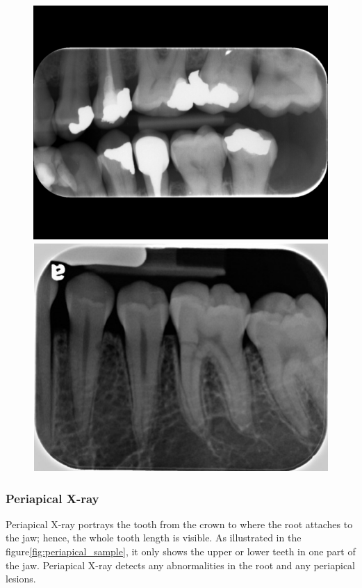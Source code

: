 \begin{figure}
    \begin{floatrow}[2]
        {\includegraphics[width=\linewidth]{images/bitewing_xray.png}}\;
        {\includegraphics[width=\linewidth]{images/periapical_xray.png}}
    \end{floatrow}
\end{figure}

\subsubsection{Periapical X-ray}
Periapical X-ray portrays the tooth from the crown to where the root attaches to the jaw; hence, the whole tooth length is visible. As illustrated in the figure\ref{fig:periapical_sample}, it only shows the upper or lower teeth in one part of the jaw.  Periapical X-ray detects any abnormalities in the root and any periapical lesions.

